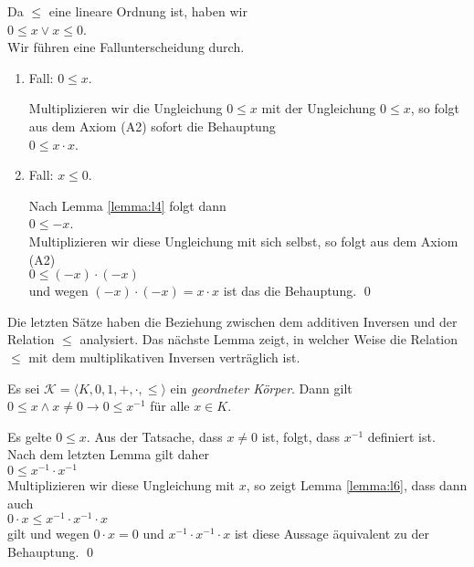 \proof
Da $\leq$ eine lineare Ordnung ist, haben wir
\\[0.2cm]
\hspace*{1.3cm}
$0 \leq x \vee x \leq 0$.
\\[0.2cm] 
Wir führen eine Fallunterscheidung durch.
\begin{enumerate}
\item Fall: $0 \leq x$.

      Multiplizieren wir die Ungleichung $0 \leq x$ mit der Ungleichung $0 \leq x$, 
      so folgt aus dem Axiom (A2) sofort die Behauptung
      \\[0.2cm]
      \hspace*{1.3cm}
      $0 \leq x \cdot x$.
\item Fall: $x \leq 0$.

      Nach Lemma \ref{lemma:l4} folgt dann
      \\[0.2cm]
      \hspace*{1.3cm}
      $0 \leq -x$.
      \\[0.2cm]
      Multiplizieren wir diese Ungleichung mit sich selbst, so folgt aus dem Axiom (A2)
      \\[0.2cm]
      \hspace*{1.3cm}
      $0 \leq (-x) \cdot (-x)$
      \\[0.2cm]
      und wegen $(-x) \cdot (-x) = x \cdot x$ ist das die Behauptung.  \qed
\end{enumerate}

Die letzten Sätze haben die Beziehung zwischen dem additiven Inversen und der Relation $\leq$ analysiert.
Das nächste Lemma zeigt, in welcher Weise die Relation $\leq$ mit dem multiplikativen Inversen
verträglich ist.

\begin{Lemma} 
  Es sei  $\mathcal{K} = \langle K, 0, 1, +, \cdot, \leq \rangle$ ein \emph{geordneter Körper}.  Dann gilt
  \\[0.2cm]
  \hspace*{1.3cm} $0 \leq x \wedge x \not= 0 \rightarrow 0 \leq x^{-1}$
  \quad für alle $x \in K$.
\end{Lemma}

\proof
Es gelte $0 \leq x$.  Aus der Tatsache, dass $x \not= 0$ ist, folgt, dass $x^{-1}$ definiert ist.
Nach dem letzten Lemma gilt daher
\\[0.2cm]
\hspace*{1.3cm}
$0 \leq x^{-1} \cdot x^{-1}$ 
\\[0.2cm]
Multiplizieren wir diese Ungleichung mit $x$, so zeigt Lemma \ref{lemma:l6}, dass dann auch
\\[0.2cm]
\hspace*{1.3cm}
$0 \cdot x \leq x^{-1} \cdot x^{-1} \cdot x$
\\[0.2cm]
gilt und wegen $0 \cdot x = 0$ und $x^{-1} \cdot x^{-1} \cdot x$ ist diese Aussage
äquivalent zu der Behauptung. \qed

